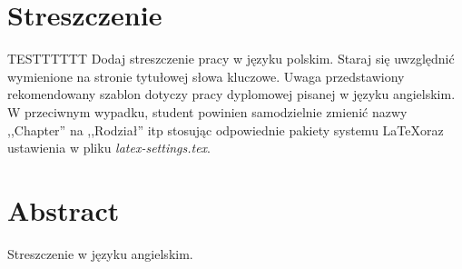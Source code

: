 \section*{Streszczenie}

TESTTTTTT
Dodaj streszczenie pracy w języku polskim. Staraj się uwzględnić wymienione na stronie tytułowej słowa kluczowe. Uwaga przedstawiony rekomendowany szablon dotyczy pracy dyplomowej pisanej w języku angielskim. W przeciwnym wypadku, student powinien samodzielnie zmienić nazwy ,,Chapter'' na ,,Rodział'' itp stosując odpowiednie pakiety systemu \LaTeX oraz ustawienia w pliku \textit{latex-settings.tex}.

\section*{Abstract}

Streszczenie  w języku angielskim.